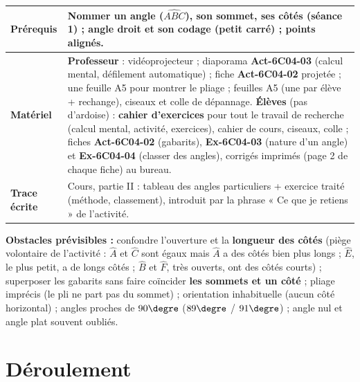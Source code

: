 \documentclass[11pt]{article}
\newcommand{\champ}[2]{\textbf{#1} & #2 \\ \hline}
\begin{document}
\begin{tabularx}{\linewidth}{|>{\raggedright\arraybackslash}p{3.6cm}|X|}
{\begin{itemize}[nosep,leftmargin=1.2em]
\end{itemize}}
\champ{Prérequis}{Nommer un angle ($\widehat{ABC}$), son sommet, ses côtés (séance 1) ; angle droit et son codage (petit carré) ; points alignés.}
\champ{Matériel}{\textbf{Professeur} : vidéoprojecteur ; diaporama \textbf{Act-6C04-03} (calcul mental, défilement automatique) ; fiche \textbf{Act-6C04-02} projetée ; une feuille A5 pour montrer le pliage ; feuilles A5 (une par élève + rechange), ciseaux et colle de dépannage.\newline
\textbf{Élèves} (pas d'ardoise) : \textbf{cahier d'exercices} pour tout le travail de recherche (calcul mental, activité, exercices), cahier de cours, ciseaux, colle ; fiches \textbf{Act-6C04-02} (gabarits), \textbf{Ex-6C04-03} (nature d'un angle) et \textbf{Ex-6C04-04} (classer des angles), corrigés imprimés (page 2 de chaque fiche) au bureau.}
\champ{Trace écrite}{Cours, partie II : tableau des angles particuliers + exercice traité (méthode, classement), introduit par la phrase « Ce que je retiens » de l'activité.}
\end{tabularx}

\vspace{2mm}
\textbf{Obstacles prévisibles :} confondre l'ouverture et la \textbf{longueur des côtés} (piège volontaire de l'activité : $\widehat{A}$ et $\widehat{C}$ sont égaux mais $\widehat{A}$ a des côtés bien plus longs ; $\widehat{E}$, le plus petit, a de longs côtés ; $\widehat{B}$ et $\widehat{F}$, très ouverts, ont des côtés courts) ;
superposer les gabarits sans faire coïncider \textbf{les sommets et un côté} ;
pliage imprécis (le pli ne part pas du sommet) ; orientation inhabituelle (aucun côté horizontal) ;
angles proches de $90\degre$ ($89\degre$ / $91\degre$) ; angle nul et angle plat souvent oubliés.

\newpage

\section*{Déroulement}
\end{document}
